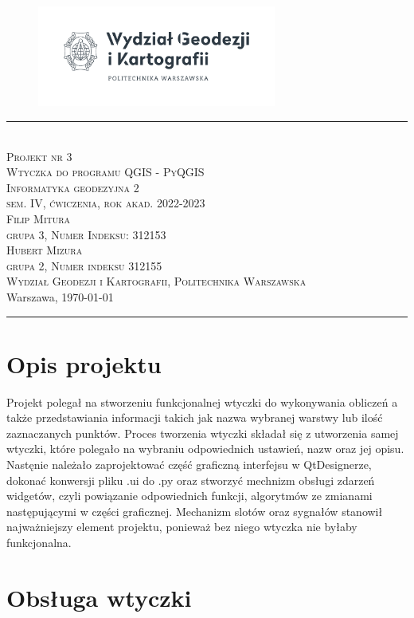 \documentclass[a4paper,12pt]{article}
\newcommand{\authorName}{Filip Mitura  \\ grupa 3, Numer Indeksu: 312153 \ \\Hubert Mizura \ \\grupa 2, Numer indeksu 312155}
\newcommand{\titeReport}{Projekt nr 3 \\ Wtyczka do programu QGIS - PyQGIS}
\newcommand{\titleLecture}{Informatyka geodezyjna 2 \\ sem. IV, ćwiczenia, rok akad. 2022-2023}
\newcommand{\faculty}{Wydział Geodezji i Kartografii}
\newcommand{\university}{Politechnika Warszawska}
\newcommand{\city}{Warszawa}
\begin{document}
	\begin{figure}
		\centering
		\includegraphics[width=0.7\textwidth]{gik.png}
	\end{figure}
	\begin{center} 
		\rule{\textwidth}{.5pt} \\
		\vspace{1.0cm}
		\Large \textsc{\titeReport}
		\vspace{0.5cm} \\  
		\large \textsc{\titleLecture}
		\vspace{0.5cm}\\
		\textsc{\authorName}  \\
		
		\textsc{\faculty}, \textsc{\university}  \\ 
		\city, \today
	\end{center} 
	\rule{\textwidth}{0.5pt}
	
	\newpage
	\section{Opis projektu}
	Projekt polegał na stworzeniu funkcjonalnej wtyczki do wykonywania obliczeń a także przedstawiania informacji takich jak nazwa wybranej warstwy lub ilość zaznaczanych punktów. Proces tworzenia wtyczki składał się z utworzenia samej wtyczki, które polegało na wybraniu odpowiednich ustawień, nazw oraz jej opisu. Nastęnie należało zaprojektować część graficzną interfejsu w QtDesignerze, dokonać konwersji pliku .ui do .py oraz stworzyć mechnizm obsługi zdarzeń widgetów, czyli powiązanie odpowiednich funkcji, algorytmów ze zmianami następującymi w części graficznej. Mechanizm slotów oraz sygnałów stanowił najważniejszy element projektu, ponieważ bez niego wtyczka nie byłaby funkcjonalna.\newline
	
	\section{Obsługa wtyczki}
\end{document}
